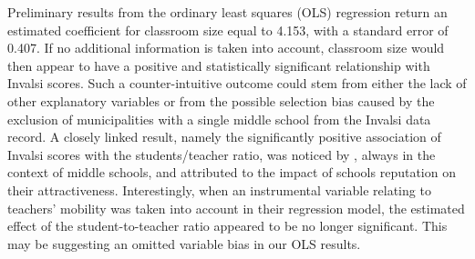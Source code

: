 \documentclass[openany, 11pt, oneside]{book}
\begin{document}
Preliminary results from the ordinary least squares (OLS) regression return an estimated coefficient for classroom size equal to 4.153, with a standard error of 0.407. If no additional information is taken into account, classroom size would then appear to have a positive and statistically significant relationship with Invalsi scores. Such a counter-intuitive outcome could stem from either the lack of other explanatory variables or from the possible selection bias caused by the exclusion of municipalities with a single middle school from the Invalsi data record. 
%
%
A closely linked result, namely the significantly positive association of Invalsi scores with the students/teacher ratio, was noticed by \cite{Barbieri}, always in the context of middle schools, and attributed to the impact of schools reputation on their attractiveness. Interestingly, when an instrumental variable relating to teachers' mobility was taken into account in their regression model, the estimated effect of the student-to-teacher ratio appeared to be no longer significant. This may be suggesting an omitted variable bias in our OLS results. 
\end{document}
